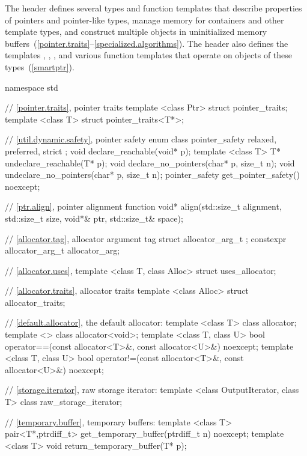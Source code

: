 \pnum
The header  defines several types and function templates that
describe properties of pointers and pointer-like types, manage memory
for containers and other template types, and construct multiple objects in
uninitialized memory
buffers~(\ref{pointer.traits}--\ref{specialized.algorithms}).
The header also defines the templates
, , , and various function
templates that operate on objects of these types~(\ref{smartptr}).

%
\begin{codeblock}
namespace std {
  // \ref{pointer.traits}, pointer traits
  template <class Ptr> struct pointer_traits;
  template <class T> struct pointer_traits<T*>;

  // \ref{util.dynamic.safety}, pointer safety
  enum class pointer_safety { relaxed, preferred, strict };
  void declare_reachable(void* p);
  template <class T> T* undeclare_reachable(T* p);
  void declare_no_pointers(char* p, size_t n);
  void undeclare_no_pointers(char* p, size_t n);
  pointer_safety get_pointer_safety() noexcept;

  // \ref{ptr.align}, pointer alignment function
  void* align(std::size_t alignment, std::size_t size,
    void*& ptr, std::size_t& space);

  // \ref{allocator.tag}, allocator argument tag
  struct allocator_arg_t { };
  constexpr allocator_arg_t allocator_arg{};

  // \ref{allocator.uses}, 
  template <class T, class Alloc> struct uses_allocator;

  // \ref{allocator.traits}, allocator traits
  template <class Alloc> struct allocator_traits;

  // \ref{default.allocator}, the default allocator:
  template <class T> class allocator;
  template <> class allocator<void>;
  template <class T, class U>
    bool operator==(const allocator<T>&, const allocator<U>&) noexcept;
  template <class T, class U>
    bool operator!=(const allocator<T>&, const allocator<U>&) noexcept;

  // \ref{storage.iterator}, raw storage iterator:
  template <class OutputIterator, class T> class raw_storage_iterator;

  // \ref{temporary.buffer}, temporary buffers:
  template <class T>
    pair<T*,ptrdiff_t> get_temporary_buffer(ptrdiff_t n) noexcept;
  template <class T>
    void return_temporary_buffer(T* p);

}
\end{codeblock}
